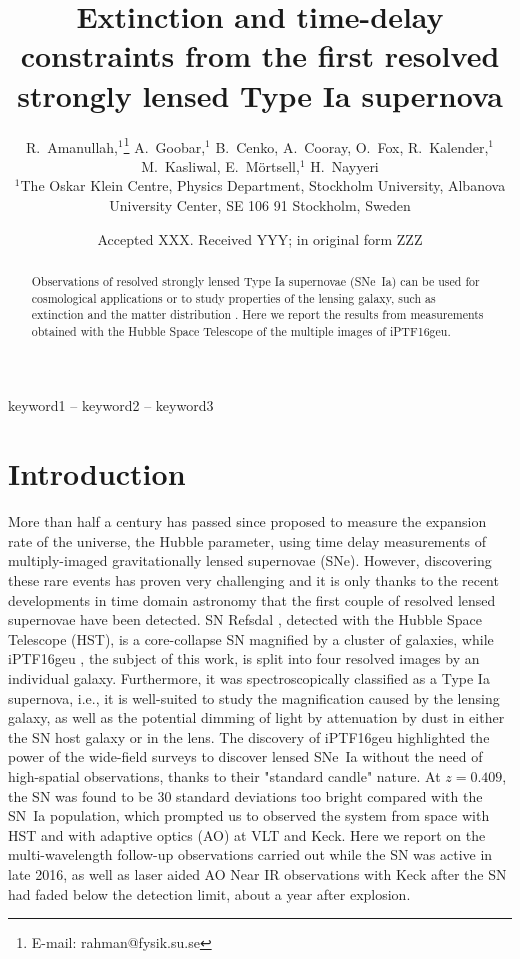 \documentclass[a4paper,fleqn,usenatbib]{mnras}
\title[Extinction and time-delay constraints from \geu]{Extinction and time-delay constraints from the first resolved strongly lensed Type Ia supernova \geu}
\author[Amanullah et al.]{%
R.~Amanullah,$^{1}$\thanks{E-mail: rahman@fysik.su.se}
A.~Goobar,$^{1}$
B.~Cenko,
A.~Cooray,
O.~Fox,
R.~Kalender,$^{1}$
\newauthor
M.~Kasliwal,
E.~M\"ortsell,$^{1}$
H.~Nayyeri
\\
$^{1}$The Oskar Klein Centre, Physics Department,
    Stockholm University,
    Albanova University Center, SE 106 91 Stockholm, Sweden\\
}
\date{Accepted XXX. Received YYY; in original form ZZZ}
\newcommand{\geu}{iPTF16geu\xspace}
\newcommand{\sn}{SN\xspace}
\newcommand{\snia}{SN~Ia\xspace}
\newcommand{\sneia}{SNe~Ia\xspace}
\newcommand{\sne}{SNe\xspace}
\begin{document}
\label{firstpage}
\pagerange{\pageref{firstpage}--\pageref{lastpage}}
\maketitle

\begin{abstract}
Observations of resolved strongly lensed Type Ia supernovae (\sneia) can be used for cosmological applications or to study
properties of the lensing galaxy, such as extinction and the matter distribution .  Here we report the results from 
measurements obtained with the Hubble Space Telescope of the multiple images of \geu.
\end{abstract}
\begin{keywords}
keyword1 -- keyword2 -- keyword3
\end{keywords}



\section{Introduction}
More than half a century has passed since
\citet{1964MNRAS.128..307R} proposed  to measure the expansion rate of the universe, the Hubble parameter, using time delay measurements of multiply-imaged gravitationally lensed supernovae (\sne). However, discovering these rare events has proven very challenging and it is only thanks to 
the recent developments in time domain astronomy that the first couple of resolved lensed supernovae have been detected. SN Refsdal \citep{2015Sci...347.1123K}, detected with the Hubble Space Telescope (HST), is a core-collapse \sn magnified by a cluster of galaxies, while 
iPTF16geu \citep{2017Sci...356..291G}, the subject of this work, is split into four resolved images by an individual galaxy. Furthermore, it was spectroscopically classified as a Type Ia supernova,  i.e., it is well-suited to study the magnification caused by the lensing galaxy, as well as the potential dimming of light by attenuation by dust in either the \sn host galaxy or in the lens. The discovery of iPTF16geu highlighted the power of the wide-field surveys to discover lensed \sneia without the need of high-spatial observations, thanks to their "standard candle" nature. At $z=0.409$, the \sn was found to be 30 standard deviations too bright compared with the \snia population, which prompted us to observed the system from space with HST and with adaptive optics (AO) at VLT and Keck.  Here we report on the multi-wavelength follow-up observations carried out while the \sn was active in late 2016, as well as laser aided AO Near IR observations with Keck after the SN had 
faded below the detection limit, about a year after explosion.
\end{document}
